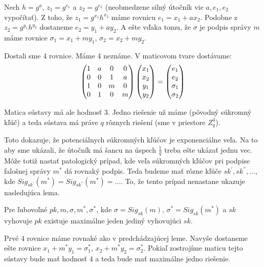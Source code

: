 \begin{dokaz}
Nech $h = g^a$, $z_1 = g^{e_1}$ a $z_2 = g^{e_2}$ 
(neobmedzene silný útočník vie $a, e_1, e_2$ vypočítať).
Z toho, že $z_1 = g^{x_1} h^{x_2}$ máme rovnicu $e_1 = x_1 + ax_2$.
Podobne z $z_2 = g^{y_1} h^{y_2}$ dostaneme $e_2 = y_1 + a y_2$.
A ešte vďaka tomu, že $\sigma$ je podpis správy $m$ máme rovnice
$\sigma_1 = x_1 + my_1$, $\sigma_2 = x_2 + my_2$. 

Dostali sme 4 rovnice. Máme 4 neznáme. V maticovom tvare dostávame:
\begin{equation*}
    \left ( \begin{matrix}
                1 & a & 0 & 0 \cr 
                0 & 0 & 1 & a \cr
                1 & 0 & m & 0 \cr
                0 & 1 & 0 & m
            \end{matrix} \right )
    \left ( \begin{matrix}
                x_1 \cr x_2 \cr y_1 \cr y_2
            \end{matrix} \right )
    =
    \left ( \begin{matrix} 
                e_1 \cr e_2 \cr \sigma_1 \cr \sigma_2
            \end{matrix} \right )
\end{equation*}

Matica sústavy má ale hodnosť $3$. Jedno riešenie už máme (pôvodný
súkromný kľúč) a teda sústava má práve $q$ rôznych riešení (sme v
priestore $Z_q^4$).

\end{dokaz}

Toto dokazuje, že potenciálnych súkromných kľúčov je exponenciálne veľa.
Na to aby sme ukázali, že útočník má
šancu na úspech $\frac{1}{q}$ treba ešte ukázať jednu vec.
Môže totiž nastať patologický prípad, kde veľa súkromných kľúčov
pri podpise falošnej správy $m^*$ dá rovnaký podpis.
Teda budeme mať rôzne kľúče $sk^{'}, sk^{''}, \dots$, 
kde $Sig_{sk^{'}}(m^*) = Sig_{sk^{''}}(m^*) = \dots$.
To, že tento prípad nenastane ukazuje nasledujúca lema.

\begin{lema}
Pre ľubovoľné $pk, m, \sigma, m^*, \sigma^*$, kde $\sigma = Sig_{sk}(m)$, $\sigma^* = Sig_{sk}(m^*)$ a $sk$ vyhovuje $pk$
existuje maximálne jeden jediný vyhovujúci $sk$.
\end{lema}

\begin{dokaz}
Prvé 4 rovnice máme rovnaké ako v predchádzajúcej leme. Navyše dostaneme ešte rovnice $x_1 + m^*y_1 = \sigma_1^*$, 
$x_2 + m^* y_2 = \sigma_2^*$.
Pokiaľ zostrojíme maticu tejto sústavy bude mať hodnosť $4$ a teda bude mať maximálne jedno riešenie.
\end{dokaz}


